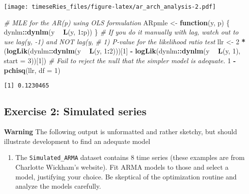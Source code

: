 \documentclass[]{book}
\newenvironment{Shaded}{\begin{snugshade}}{\end{snugshade}}
\newcommand{\KeywordTok}[1]{\textcolor[rgb]{0.13,0.29,0.53}{\textbf{#1}}}
\newcommand{\DataTypeTok}[1]{\textcolor[rgb]{0.13,0.29,0.53}{#1}}
\newcommand{\DecValTok}[1]{\textcolor[rgb]{0.00,0.00,0.81}{#1}}
\newcommand{\StringTok}[1]{\textcolor[rgb]{0.31,0.60,0.02}{#1}}
\newcommand{\CommentTok}[1]{\textcolor[rgb]{0.56,0.35,0.01}{\textit{#1}}}
\newcommand{\ControlFlowTok}[1]{\textcolor[rgb]{0.13,0.29,0.53}{\textbf{#1}}}
\newcommand{\OperatorTok}[1]{\textcolor[rgb]{0.81,0.36,0.00}{\textbf{#1}}}
\newcommand{\NormalTok}[1]{#1}
\providecommand{\tightlist}{%
  \setlength{\itemsep}{0pt}\setlength{\parskip}{0pt}}
\begin{document}
\texttt{[image: timeseRies\_files/figure-latex/ar\_arch\_analysis-2.pdf]}

\begin{Shaded}
\begin{Highlighting}[]
\CommentTok{# MLE for the AR(p) using OLS formulation}
\NormalTok{ARpmle <-}\StringTok{ }\ControlFlowTok{function}\NormalTok{(y, p) \{}
\NormalTok{    dynlm}\OperatorTok{::}\KeywordTok{dynlm}\NormalTok{(y }\OperatorTok{~}\StringTok{ }\KeywordTok{L}\NormalTok{(y, }\DecValTok{1}\OperatorTok{:}\NormalTok{p))}
\NormalTok{\}}
\CommentTok{# If you do it manually with lag, watch out to use lag(y, -1) and NOT lag(y,}
\CommentTok{# 1) P-value for the likelihood ratio test}
\NormalTok{llr <-}\StringTok{ }\DecValTok{2} \OperatorTok{*}\StringTok{ }\NormalTok{(}\KeywordTok{logLik}\NormalTok{(dynlm}\OperatorTok{::}\KeywordTok{dynlm}\NormalTok{(y }\OperatorTok{~}\StringTok{ }\KeywordTok{L}\NormalTok{(y, }\DecValTok{1}\OperatorTok{:}\DecValTok{2}\NormalTok{)))[}\DecValTok{1}\NormalTok{] }\OperatorTok{-}\StringTok{ }\KeywordTok{logLik}\NormalTok{(dynlm}\OperatorTok{::}\KeywordTok{dynlm}\NormalTok{(y }\OperatorTok{~}\StringTok{ }
\StringTok{    }\KeywordTok{L}\NormalTok{(y, }\DecValTok{1}\NormalTok{), }\DataTypeTok{start =} \DecValTok{3}\NormalTok{))[}\DecValTok{1}\NormalTok{])}
\CommentTok{# Fail to reject the null that the simpler model is adequate.}
\DecValTok{1} \OperatorTok{-}\StringTok{ }\KeywordTok{pchisq}\NormalTok{(llr, }\DataTypeTok{df =} \DecValTok{1}\NormalTok{)}
\end{Highlighting}
\end{Shaded}

\begin{verbatim}
[1] 0.1230465
\end{verbatim}

\subsection{Exercise 2: Simulated
series}\label{exercise-2-simulated-series-1}

\textbf{Warning} The following output is unformatted and rather sketchy,
but should illustrate development to find an adequate model

\begin{enumerate}
\def\labelenumi{\arabic{enumi}.}
\tightlist
\item
  The \texttt{Simulated\_ARMA} dataset contains 8 time series (these
  examples are from Charlotte Wickham's website). Fit ARMA models to
  those and select a model, justifying your choice. Be skeptical of the
  optimization routine and analyze the models carefully.
\end{enumerate}
\end{document}
